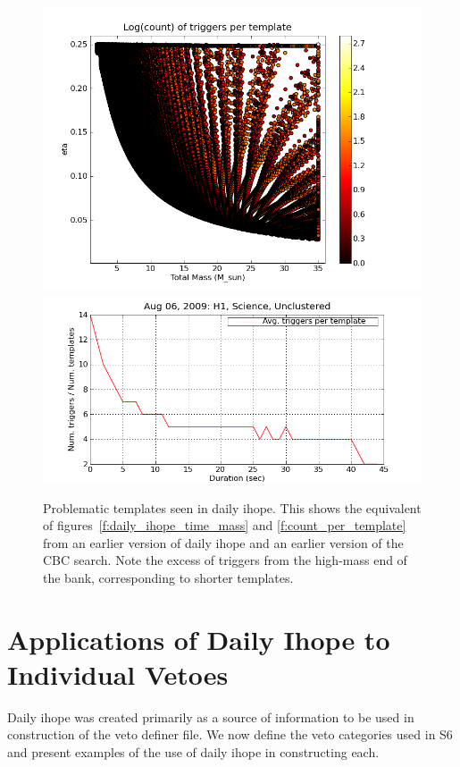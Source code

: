 \begin{figure}
  \includegraphics[width=0.5\linewidth]{figures/detchar/20090806_H1_0_UNCLUSTERED_template_counts}
  \includegraphics[width=0.5\linewidth]{figures/detchar/20090806_H1_0_UNCLUSTERED_mass_hist_norm}
  \caption[Problematic templates seen in daily ihope]{
  \label{f:daily_ihope_el_glitcho}
Problematic templates seen in daily ihope.  This shows the equivalent
of figures~\ref{f:daily_ihope_time_mass} and
\ref{f:count_per_template} from an earlier version of daily ihope and
an earlier version of the CBC search.  Note the excess of triggers
from the high-mass end of the bank, corresponding to shorter
templates.
}
\end{figure}%



\section{Applications of Daily Ihope to Individual Vetoes}
\label{sec:applications_vetoes}

Daily ihope was created primarily as a source of information to be
used in construction of the veto definer file.  We now define the veto
categories used in S6 and present examples of the use of daily ihope
in constructing each.

